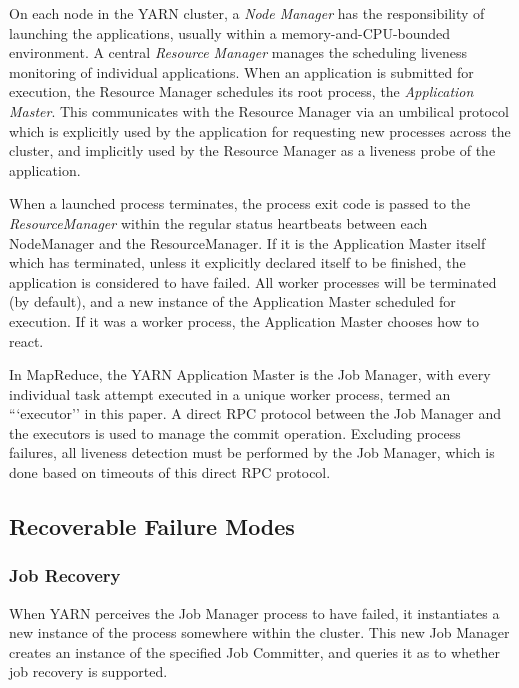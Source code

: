 \documentclass[format=acmsmall, screen=true, review=false]{acmart}
\begin{document}
On each node in the YARN cluster, a \emph{Node Manager} has the responsibility
of launching the applications, usually within a memory-and-CPU-bounded
environment.
A central \emph{Resource Manager} manages the scheduling liveness monitoring
of individual applications.
When an application is submitted for execution, the Resource Manager schedules
its root process, the \emph{Application Master}.
This communicates with the Resource Manager via an umbilical protocol
which is explicitly used by the application for requesting new processes
across the cluster, and implicitly used by the Resource Manager
as a liveness probe of the application.

When a launched process terminates, the process exit code
is passed to the \emph{ResourceManager} within the regular status heartbeats
between each NodeManager and the ResourceManager.
If it is the Application Master itself which has terminated, unless it explicitly
declared itself to be finished, the application is considered to have failed.
All worker processes will be terminated (by default), and a new instance
of the Application Master scheduled for execution.
If it was a worker process, the Application Master chooses how to    react.


In MapReduce, the YARN Application Master is the Job Manager,
with every individual task attempt executed in a unique worker process, termed
an ```executor'' in this paper.
A direct RPC protocol between the Job Manager and the executors is used to manage
the commit operation.
Excluding process failures, all liveness detection must be performed by the
Job Manager, which is done based on timeouts of this direct RPC protocol.


\subsection{Recoverable Failure Modes}
\label{subsec:optionalRecoverableFailureModes}

\subsubsection{Job Recovery}

When YARN perceives the Job Manager process to have failed, it instantiates
a new instance of the process somewhere within the cluster.
This new Job Manager creates an instance of the specified Job Committer,
and queries it as to whether job recovery is supported.
\end{document}

